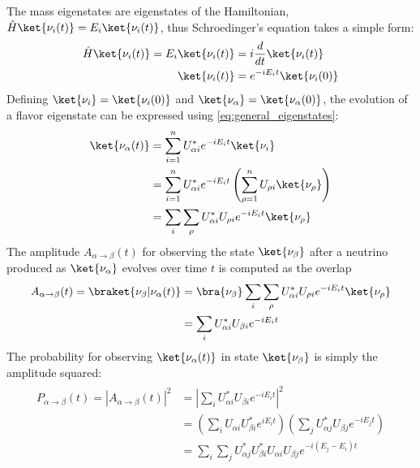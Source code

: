 The mass eigenstates are eigenstates of the Hamiltonian,
$\hat{H}\ket{\nu_i(t)} = E_i\ket{\nu_i(t)}$,
thus Schroedinger's equation takes a simple form:
\begin{align}\label{eq:schroedinger}
    \begin{split}
        \hat{H}\ket{\nu_i(t)} = E_i\ket{\nu_i(t)} &= i\frac{d}{dt}\ket{\nu_i(t)} \\
        \ket{\nu_i(t)} &= e^{-iE_it}\ket{\nu_i(0)}
    \end{split}
\end{align}
Defining $\ket{\nu_i} = \ket{\nu_i(0)}$ and $\ket{\nu_\alpha} = \ket{\nu_\alpha(0)}$,
the evolution of a flavor eigenstate can be expressed
using \cref{eq:general_eigenstates}:
\begin{align}\label{eq:state_evolution}
    \begin{split}
        \ket{\nu_\alpha(t)}
        &= \sum_{i=1}^n U^*_{\alpha i} e^{-iE_it}\ket{\nu_i} \\
        &= \sum_{i=1}^nU^*_{\alpha i} e^{-iE_it}
        \left(\sum_{\rho=1}^n U_{\rho i} \ket{\nu_\rho}\right) \\
        &= \sum_i\sum_\rho U^*_{\alpha i} U_{\rho i} e^{-iE_it}\ket{\nu_\rho}
    \end{split}
\end{align}
The amplitude $A_{\alpha\to\beta}(t)$
for observing the state $\ket{\nu_\beta}$ after
a neutrino produced as $\ket{\nu_\alpha}$ evolves over time $t$
is computed as the overlap
\begin{align}\label{eq:osc_amplitude}
    \begin{split}
        A_{\alpha\to\beta}(t) = \braket{\nu_\beta | \nu_\alpha(t)}
        &= \bra{\nu_\beta} \sum_i\sum_\rho U^*_{\alpha i} U_{\rho i}
        e^{-iE_it}\ket{\nu_\rho} \\
        &= \sum_i U^*_{\alpha i} U_{\beta i} e^{-iE_it} \\
    \end{split}
\end{align}
The probability for observing $\ket{\nu_\alpha(t)}$ in state $\ket{\nu_\beta}$
is simply the amplitude squared:
\begin{align}\label{eq:oscprob_general}
    \begin{split}
        P_{\alpha\to\beta}(t) = \left|A_{\alpha\to\beta}(t)\right|^2
        &= \left|\sum_i U^*_{\alpha i} U_{\beta i} e^{-iE_it}\right|^2 \\
        &= \left(\sum_iU_{\alpha i} U^*_{\beta i} e^{iE_it}\right)
        \left(\sum_j U^*_{\alpha j} U_{\beta j} e^{-iE_jt}\right) \\
        &= \sum_i\sum_j U^*_{\alpha j} U^*_{\beta i} U_{\alpha i} U_{\beta j}
        e^{-i(E_j - E_i)t}
    \end{split}
\end{align}
